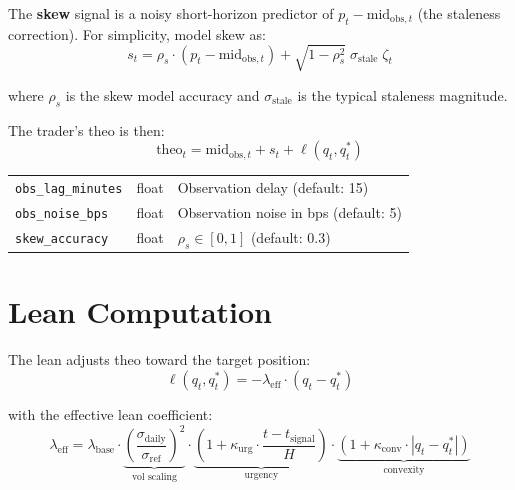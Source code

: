 \documentclass[11pt,a4paper]{article}
\begin{document}
The \textbf{skew} signal is a noisy short-horizon predictor of $p_t - \text{mid}_{\text{obs},t}$ (the staleness correction). For simplicity, model skew as:
\begin{equation}
s_t = \rho_s \cdot (p_t - \text{mid}_{\text{obs},t}) + \sqrt{1 - \rho_s^2}\;\sigma_{\text{stale}}\;\zeta_t
\end{equation}

where $\rho_s$ is the skew model accuracy and $\sigma_{\text{stale}}$ is the typical staleness magnitude.

The trader's theo is then:
\begin{equation}
\text{theo}_t = \text{mid}_{\text{obs},t} + s_t + \ell(q_t, q^*_t)
\end{equation}

\begin{parambox}[Knobs]
\begin{tabular}{@{}lll@{}}
\texttt{obs\_lag\_minutes} & float & Observation delay (default: 15) \\
\texttt{obs\_noise\_bps} & float & Observation noise in bps (default: 5) \\
\texttt{skew\_accuracy} & float & $\rho_s \in [0, 1]$ (default: 0.3) \\
\end{tabular}
\end{parambox}


\section{Lean Computation}\label{sec:lean}

The lean adjusts theo toward the target position:
\begin{equation}
\ell(q_t, q^*_t) = -\lambda_{\text{eff}} \cdot (q_t - q^*_t)
\end{equation}

with the effective lean coefficient:
\begin{equation}
\lambda_{\text{eff}} = \lambda_{\text{base}} \cdot \underbrace{\left(\frac{\sigma_{\text{daily}}}{\sigma_{\text{ref}}}\right)^2}_{\text{vol scaling}} \cdot \underbrace{\left(1 + \kappa_{\text{urg}} \cdot \frac{t - t_{\text{signal}}}{H}\right)}_{\text{urgency}} \cdot \underbrace{\left(1 + \kappa_{\text{conv}} \cdot |q_t - q^*_t|\right)}_{\text{convexity}}
\end{equation}
\end{document}
